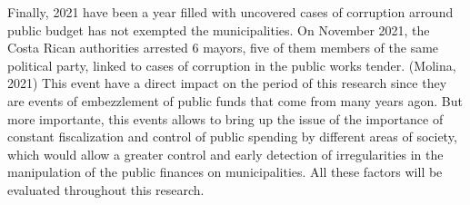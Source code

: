 Finally, 2021 have been a year filled with uncovered cases of corruption arround public budget has not exempted the municipalities. On November 2021, the Costa Rican authorities arrested 6 mayors, five of them members of the same political party, linked to cases of corruption in the public works tender. (Molina, 2021) This event have a direct impact on the period of this research since they are events of embezzlement of public funds that come from many years agon. But more importante, this events allows to bring up the issue of the importance of constant fiscalization and control of public spending by different areas of society, which would allow a greater control and early detection of irregularities in the manipulation of the public finances on municipalities. All these factors will be evaluated throughout this research. 
